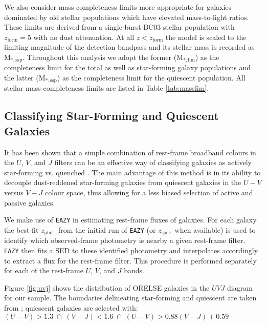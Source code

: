 \documentclass[a4paper,fleqn,usenatbib]{mnras}
\def\zphot{$z_{\mathrm{phot}}$}
\def\zspec{$z_{\mathrm{spec}}$}
\begin{document}
We also consider mass completeness limits more appropriate for galaxies dominated by old stellar populations which have elevated mass-to-light ratios.
These limits are derived from a single-burst BC03 stellar population with $z_{\mathrm{form}} = 5$ with no dust attenuation. 
At all $z < z_{\mathrm{form}}$ the model is scaled to the limiting magnitude of the detection bandpass and its stellar mass is recorded as M$_{\mathrm{*, ssp}}$.
Throughout this analysis we adopt the former (M$_{*, \mathrm{lim}}$) as the completeness limit for the total as well as star-forming galaxy populations and the latter (M$_{\mathrm{*, ssp}}$) as the completeness limit for the quiescent population.
All stellar mass completeness limits are listed in Table \ref{tab:masslim}.





\subsection{Classifying Star-Forming and Quiescent Galaxies}
\label{sec:uvj}


It has been shown that a simple combination of rest-frame broadband colours in the $U$, $V$, and $J$ filters can be an effective way of classifying galaxies as actively star-forming vs. quenched \citep[e.g.][]{Wuyts2007, Williams2009}.
The main advantage of this method is in its ability to decouple dust-reddened star-forming galaxies from quiescent galaxies in the $U - V$ versus $V - J$ colour space, thus allowing for a less biased selection of active and passive galaxies.


We make use of {\tt EAZY} in estimating rest-frame fluxes of galaxies.
For each galaxy the best-fit \zphot\ from the initial run of {\tt EAZY} (or \zspec\ when available) is used to identify which observed-frame photometry is nearby a given rest-frame filter.
{\tt EAZY} then fits a SED to these identified photometry and interpolates accordingly to extract a flux for the rest-frame filter.
This procedure is performed separately for each of the rest-frame $U$, $V$, and $J$ bands.


Figure \ref{fig:uvj} shows the distribution of ORELSE galaxies in the $UVJ$ diagram for our sample.
The boundaries delineating star-forming and quiescent are taken from \citet{Whitaker2011}; quiescent galaxies are selected with: $(U - V) > 1.3 \; \cap \; (V - J) < 1.6 \; \cap \; (U - V) > 0.88 (V - J) + 0.59$
\end{document}
